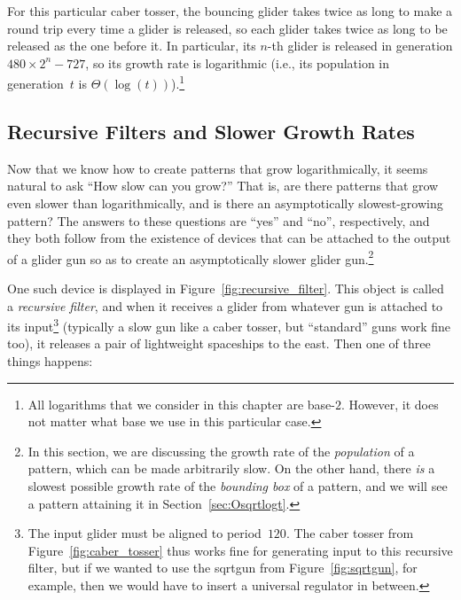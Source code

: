 For this particular caber tosser, the bouncing glider takes twice as long to make a round trip every time a glider is released, so each glider takes twice as long to be released as the one before it. In particular, its $n$-th glider is released in generation $480 \times 2^n - 727$, so its growth rate is logarithmic (i.e., its population in generation~$t$ is $\Theta(\log(t))$).\footnote{All logarithms that we consider in this chapter are base-$2$. However, it does not matter what base we use in this particular case.}


\subsection{Recursive Filters and Slower Growth Rates}\label{sec:recursive_filter}

Now that we know how to create patterns that grow logarithmically, it seems natural to ask ``How slow can you grow?'' That is, are there patterns that grow even slower than logarithmically, and is there an asymptotically slowest-growing pattern? The answers to these questions are ``yes'' and ``no'', respectively, and they both follow from the existence of devices that can be attached to the output of a glider gun so as to create an asymptotically slower glider gun.\footnote{In this section, we are discussing the growth rate of the \emph{population} of a pattern, which can be made arbitrarily slow. On the other hand, there \emph{is} a slowest possible growth rate of the \emph{bounding box} of a pattern, and we will see a pattern attaining it in Section~\ref{sec:Osqrtlogt}.}

One such device is displayed in Figure~\ref{fig:recursive_filter}. This object is called a \emph{recursive filter}, and when it receives a glider from whatever gun is attached to its input\footnote{The input glider must be aligned to period~$120$. The caber tosser from Figure~\ref{fig:caber_tosser} thus works fine for generating input to this recursive filter, but if we wanted to use the sqrtgun from Figure~\ref{fig:sqrtgun}, for example, then we would have to insert a universal regulator in between.} (typically a slow gun like a caber tosser, but ``standard'' guns work fine too), it releases a pair of lightweight spaceships to the east. Then one of three things happens:\smallskip

